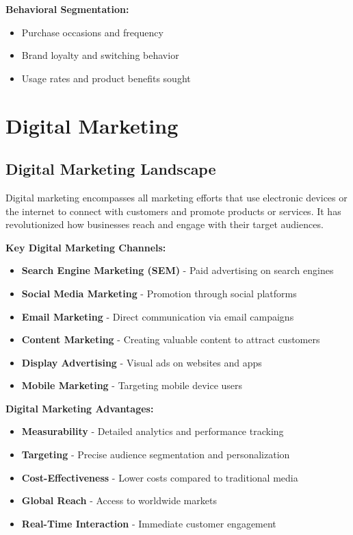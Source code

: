 \documentclass[12pt]{article}
\begin{document}
\textbf{Behavioral Segmentation:}
\begin{itemize}
    \item Purchase occasions and frequency
    \item Brand loyalty and switching behavior
    \item Usage rates and product benefits sought
\end{itemize}

\section{Digital Marketing}

\subsection{Digital Marketing Landscape}
Digital marketing encompasses all marketing efforts that use electronic devices or the internet to connect with customers and promote products or services. It has revolutionized how businesses reach and engage with their target audiences.

\textbf{Key Digital Marketing Channels:}
\begin{itemize}
    \item \textbf{Search Engine Marketing (SEM)} - Paid advertising on search engines
    \item \textbf{Social Media Marketing} - Promotion through social platforms
    \item \textbf{Email Marketing} - Direct communication via email campaigns
    \item \textbf{Content Marketing} - Creating valuable content to attract customers
    \item \textbf{Display Advertising} - Visual ads on websites and apps
    \item \textbf{Mobile Marketing} - Targeting mobile device users
\end{itemize}

\textbf{Digital Marketing Advantages:}
\begin{itemize}
    \item \textbf{Measurability} - Detailed analytics and performance tracking
    \item \textbf{Targeting} - Precise audience segmentation and personalization
    \item \textbf{Cost-Effectiveness} - Lower costs compared to traditional media
    \item \textbf{Global Reach} - Access to worldwide markets
    \item \textbf{Real-Time Interaction} - Immediate customer engagement
\end{itemize}
\end{document}
